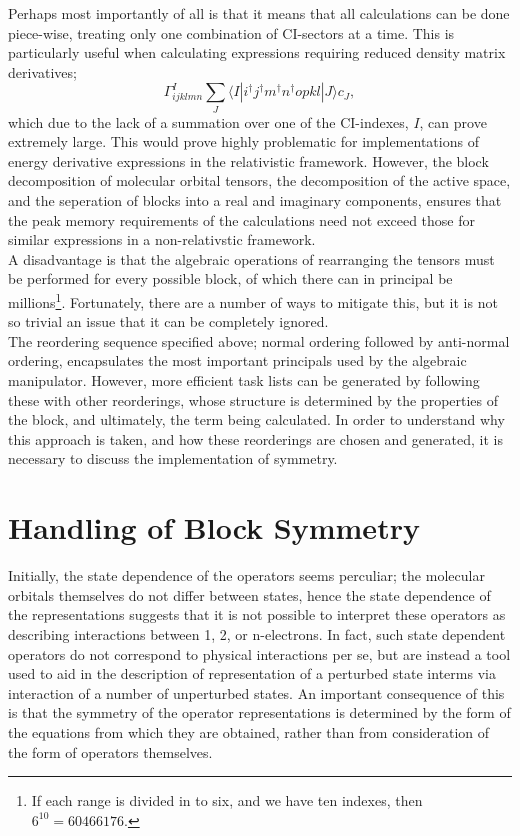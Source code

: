 \documentclass[12pt]{article}
\begin{document}
\noindent Perhaps most importantly of all is that it means that
all calculations can be done piece-wise, treating only one combination of CI-sectors
at a time. This is particularly useful when calculating expressions requiring reduced density matrix derivatives;
\begin{equation}
\Gamma^{I}_{ijklmn}\sum_{J}\langle I | i^{\dagger}j^{\dagger}m^{\dagger}n^{\dagger}opkl | J \rangle c_{J},
\end{equation}
which due to the lack of a summation over one of the CI-indexes, $I$, can prove extremely large. This
would prove highly problematic for implementations of energy derivative expressions in the
relativistic framework. However, the block decomposition of molecular orbital tensors,
the decomposition of the active space, and the seperation of blocks into
a real and imaginary components, ensures that the peak memory requirements of the 
calculations need not exceed those for similar expressions in a non-relativstic framework.\\

\noindent A disadvantage is that the algebraic operations of
rearranging the tensors must be performed for every possible block, of which
there can in principal be millions\footnote{ If each range is divided in to 
six, and we have ten indexes, then $6^{10} =60466176 $. }. Fortunately, there
are a number of ways to mitigate this, but it is not so trivial an issue that it can
be completely ignored.\\

\noindent The reordering sequence specified above; normal ordering followed by anti-normal 
ordering, encapsulates the most important principals used by the algebraic manipulator. However,
more efficient task lists can be generated by following these with other reorderings, whose structure
is determined by the properties of the block, and ultimately, the term being calculated. In order to understand
why this approach is taken, and how these reorderings are chosen and generated, it is necessary to discuss the implementation
of symmetry.

\section{Handling of Block Symmetry}

\noindent Initially, the state dependence of the operators seems perculiar; the
molecular orbitals themselves do not differ between states, hence the state
dependence of the representations suggests that it is not possible to interpret
these operators as describing interactions between 1, 2, or n-electrons.  In
fact, such state dependent operators do not correspond to physical interactions
per se, but are instead a tool used to aid in the description of representation
of a perturbed state interms via interaction of a number of unperturbed states.
An important consequence of this is that the symmetry of the operator
representations is determined by the form of the equations from which they are
obtained, rather than from consideration of the form of operators themselves.
\end{document}
